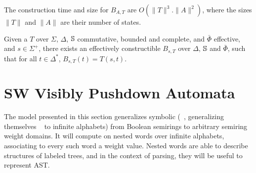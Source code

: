 \noindent
The construction time and size for $B_{A, T}$ are $O(\| T \|^3 . \| A \|^2)$,
where the sizes $\| T \|$ and $\| A \|$ are their number of states.


\begin{corollary} \label{cor:epsilon}
Given a \SWT $T$ over $\Sigma$, $\Delta$, 
$\mathbb{S}$ commutative, bounded and complete,
and $\bar\Phi$ effective,
and $s \in \Sigma^+$, 
there exists an effectively constructible \SWA 
$B_{s, T}$ over $\Delta$, $\mathbb{S}$ and $\bar\Phi$,
such that for all $t \in \Delta^*$, $B_{s, T}(t) = T(s, t)$.
\end{corollary}



 







\section{SW Visibly Pushdown Automata}
\label{section:SWVPA}\label{sec:SWVPA}
The model presented in this section generalizes symbolic \VPA
(\SVPA~\cite{dAntonyAlur14SVPDA}, 
 generalizing themselves \VPA~\cite{AlurMadhusudan09nested} to infinite alphabets)
from Boolean semirings to arbitrary semiring weight domains.
It will compute on nested words over infinite alphabets, 
associating to every such word a weight value. 
Nested words are able to describe structures of labeled trees, 
and in the context of parsing, they will be useful to 
represent AST. %

